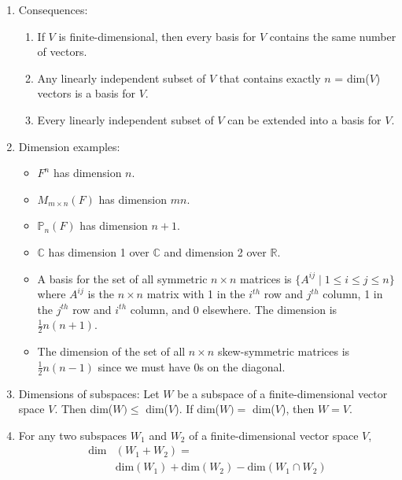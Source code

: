 \documentclass[10pt]{article}
\begin{document}
\begin{multicols*}{2}
\begin{enumerate}
\begin{enumerate}
        \item Consequences: 
        \begin{enumerate}
            \item If $V$ is finite-dimensional, then every basis for $V$ contains the same number of vectors.
            \item Any linearly independent subset of $V$ that contains exactly $n$ = dim($V$) vectors is a basis for $V$.
            \item Every linearly independent subset of $V$ can be extended into a basis for $V$.
        \end{enumerate}
        
        \item Dimension examples:
        \begin{itemize}
            \item $F^n$ has dimension $n$.
            \item $M_{m \times n}(F)$ has dimension $mn$.
            \item $\mathbb{P}_n(F)$ has dimension $n+1$.
            \item $\mathbb{C}$ has dimension 1 over $\mathbb{C}$ and dimension 2 over $\mathbb{R}$.
            \item A basis for the set of all symmetric $n \times n$ matrices is $\{ A^{ij} \mid 1 \leq i \leq j \leq n \}$ where $A^{ij}$ is the $n \times n$ matrix with 1 in the $i^{th}$ row and $j^{th}$ column, 1 in the $j^{th}$ row and $i^{th}$ column, and 0 elsewhere. The dimension is $\frac{1}{2} n(n+1)$.
            \item The dimension of the set of all $n \times n$ skew-symmetric matrices is $\frac{1}{2} n(n-1)$ since we must have 0s on the diagonal. 
        \end{itemize}
        \item Dimensions of subspaces: Let $W$ be a subspace of a finite-dimensional vector space $V$. Then dim($W) \leq $ dim($V$). If dim($W) = $ dim($V$), then $W = V$.
        \item For any two subspaces $W_1$ and $W_2$ of a finite-dimensional vector space $V$,
        \begin{align*}
            \text{dim}&(W_1 + W_2) = \\ &\text{dim}(W_1) + \text{dim}(W_2) - \text{dim}(W_1 \cap W_2)
        \end{align*}
    \end{enumerate}
    

\end{enumerate}
\end{multicols*}
\end{document}
